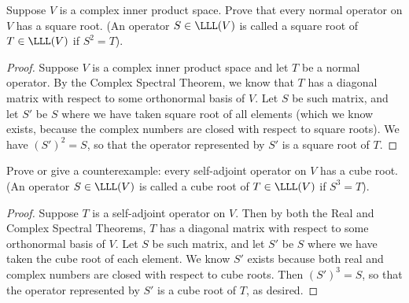 \begin{exercise}{9}
  Suppose $V$ is a complex inner product space. Prove that every normal operator on $V$ has a square root. (An operator $S\in\LLL(V)$ is called a square root of $T\in\LLL(V)$ if $S^2=T$).
\end{exercise}
\begin{proof}
 Suppose $V$ is a complex inner product space and let $T$ be a normal operator. By the Complex Spectral Theorem, we know that $T$ has a diagonal matrix with respect to some orthonormal basis of $V$. Let $S$ be such matrix, and let $S'$ be $S$ where we have taken square root of all elements (which we know exists, because the complex numbers are closed with respect to square roots). We have $(S')^2=S$, so that the operator represented by $S'$ is a square root of $T$.
\end{proof}

\begin{exercise}{11}
  Prove or give a counterexample: every self-adjoint operator on $V$ has a cube root. (An operator $S\in\LLL(V)$ is called a cube root of $T\in\LLL(V)$ if $S^3=T$).
\end{exercise}
\begin{proof}
Suppose $T$ is a self-adjoint operator on $V$. Then by both the Real and Complex Spectral Theorems, $T$ has a diagonal matrix with respect to some orthonormal basis of $V$. Let $S$ be such matrix, and let $S'$ be $S$ where we have taken the cube root of each element. We know $S'$ exists because both real and complex numbers are closed with respect to cube roots. Then $(S')^3=S$, so that the operator represented by $S'$ is a cube root of $T$, as desired. 
\end{proof}